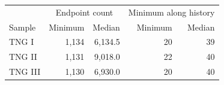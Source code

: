 \begin{tabular}{lrrrr}
\toprule
 & \multicolumn{2}{c}{Endpoint count} & \multicolumn{2}{c}{Minimum along history} \\
Sample & Minimum & Median & Minimum & Median \\
\midrule
TNG I & 1,134 & 6,134.5 & 20 & 39 \\
TNG II & 1,131 & 9,018.0 & 22 & 40 \\
TNG III & 1,130 & 6,930.0 & 20 & 40 \\
\bottomrule
\end{tabular}
